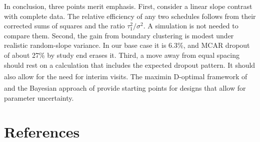 \documentclass[
  11pt,
]{article}
\begin{document}
In conclusion, three points merit emphasis. First, consider a
linear slope contrast with complete data. The relative efficiency
of any two schedules follows from their corrected sums of squares
and the ratio \(\tau_1^2 / \sigma^2\). A simulation is not needed to compare
them. Second, the gain from boundary clustering is modest under
realistic random-slope variance. In our base case it is
6.3\%, and MCAR dropout of
about 27\% by study end erases
it. Third, a move away from equal spacing should rest on a
calculation that includes the expected dropout pattern. It should
also allow for the need for interim visits. The maximin D-optimal framework of\textsuperscript{} and the Bayesian approach of\textsuperscript{}
provide starting points for designs that allow for parameter
uncertainty.

\section{References}\label{references}
\end{document}
